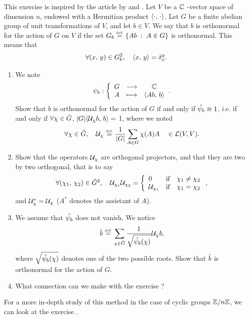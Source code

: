 \begin{exo}
\label{exo-orthogonalization-abelian-group}

   This exercise is inspired by the article by  and . Let $ V $ be a $\mathbb{C}$ -vector space of dimension $n$, endowed with a Hermitian product $\langle \cdot,\,\cdot\rangle$. Let $G$ be a finite abelian group of unit transformations of $ V $, and let $ b \in V $. We say that $ b $ is orthonormal for the action of $G$ on $ V $ if the set $ G_b \stackrel{\mbox{\upshape\tiny def.}}{=} \left\{ A b \;:\; A \in G \right\}$ is orthonormal. This means that
\begin{equation*}
\forall (x, \, y) \in G_b^2, \quad \langle x,\,y\rangle = \delta_x^y.
\end{equation*}
\begin{enumerate}
\item We note
\begin{equation*}
\psi_b: {\left\{ \begin{array}{ccc} G & \longrightarrow & \mathbb{C} \\ A & \longmapsto & \langle A b,\,b\rangle \end{array} \right.}.
\end{equation*}
Show that $ b $ is orthonormal for the action of $G$ if and only if $\hat{\psi_b} \equiv 1$, i.e. if and only if $\forall \chi \in \hat{G}$, $|G|\langle \mathcal{U}_ \chi b,\,b\rangle = $ 1, where we noted
\begin{equation*}
\forall \chi \in \hat{G}, \quad \mathcal{U}_ \chi \stackrel{\mbox{\upshape\tiny def.}}{=} \frac{1}{|G|} \sum_{A \in G}{\chi(A) A} \quad \in \mathcal{L} (V, V).
\end{equation*}

\item Show that the operators $\mathcal{U}_ \chi$ are orthogonal projectors, and that they are two by two orthogonal, that is to say
\begin{equation*}
\forall(\chi_1, \, \chi_2) \in \hat{G}^2, \quad \mathcal{U}_{\chi_1} \mathcal{U}_{\chi_2} = \left\{\begin{array}{lll} 0 & \text{if} & \chi_1 \neq \chi_2 \\\mathcal{U}_{\chi_1} & \text{if} & \chi_1 = \chi_2 \end{array} \right.,
\end{equation*}
and $\mathcal{U}_ \chi^* = \mathcal{U}_ \chi$ ($ A^*$ denotes the assistant of $A$).
\item We assume that $\hat{\psi_b}$ does not vanish. We notice
\begin{equation*}
\tilde{b} \stackrel{\mbox{\upshape\tiny def.}}{=} \sum_{\chi \in \hat{G}}{\frac{1}{\sqrt{\hat{\psi_b}(\chi)}} \mathcal{U}_ \chi b},
\end{equation*}
where $\sqrt{\hat{\psi_b}(\chi)}$ denotes one of the two possible roots. Show that $\tilde{b}$ is orthonormal for the action of $G$.
\item What connection can we make with the exercise ?
\end{enumerate} For a more in-depth study of this method in the case of cyclic groups $\mathbb{Z}/n\mathbb{Z}$, we can look at the exercise .
\end{exo}


